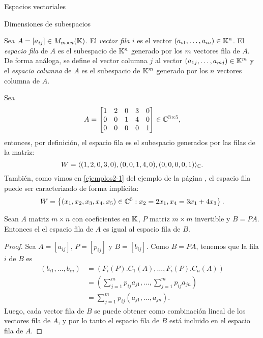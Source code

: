 \begin{chapter}{Espacios vectoriales}
\begin{section}{Dimensiones de subespacios}
        
    \begin{definicion}\label{espacio-fila-columna}
        Sea $A = [a_{ij}] \in M_{m \times n}(\mathbb K)$. El \textit{vector fila $i$} es el vector  $(a_{i1},\ldots,a_{in}) \in \mathbb K^n$. El \textit{espacio fila} de $A$ es el subespacio de $\mathbb K^n$ generado por los $m$ vectores fila de $A$.  De forma análoga, se define  el vector columna $j$ al vector $(a_{1j},\ldots,a_{mj}) \in \mathbb K^m$ y  el \textit{espacio columna} de $A$ es el subespacio de $\mathbb K^m$ generado por los $n$ vectores columna de $A$.  
    \end{definicion}

    \begin{ejemplo*}
        Sea
        $$
        A = \begin{bmatrix}
        1&2&0&3&0\\ 0&0&1&4&0 \\0&0&0&0&1
        \end{bmatrix} \in \mathbb C^{3 \times 5},
        $$
        entonces, por definición, el espacio fila es el subespacio generados por las filas de la matriz: 
        $$
        W = \langle  (1,2,0,3,0), (0,0,1,4,0), (0,0,0,0,1) \rangle_\mathbb C.
        $$ 
        También, como vimos en \ref{ejemplos2-1} del ejemplo de la página \pageref{ejemplos2}, el espacio fila puede ser caracterizado de forma implícita:
        \begin{align*}
        W =\left\{(x_1,x_2,x_3,x_4,x_5)\in \mathbb C^5: x_2 = 2x_1, x_4 = 3x_1+4x_3 \right\}.
        \end{align*}
    \end{ejemplo*}
	

        \begin{teorema}
            Sean $A$ matriz $m \times n$ con coeficientes en $\mathbb K$, $P$ matriz $m\times m$ invertible y $B =PA$. Entonces el el espacio fila de $A$ es igual al espacio fila de $B$.
        \end{teorema}
        \begin{proof}
            Sea $A= [a_{ij}]$, $P =[p_{ij}]$ y $B = [b_{ij}]$. Como  $B= PA$, tenemos que la fila $i$ de $B$ es
            \begin{align*}
                (b_{i1},\ldots,b_{in})&= (F_i(P).C_1(A),\ldots,F_i(P).C_n(A)) \\
                &= (\sum_{j=1}^{m} p_{ij}a_{j1}, \ldots, \sum_{j=1}^{m} p_{ij}a_{jn}) \\
                &= \sum_{j=1}^{m} p_{ij}(a_{j1}, \ldots,a_{jn}).
            \end{align*}
        Luego, cada vector fila de $B$ se puede obtener como combinación lineal de los vectores fila de $A$, y por lo tanto el espacio fila de $B$ está incluido en el espacio fila de $A$. 
        

\end{proof}
\end{section}
\end{chapter}
